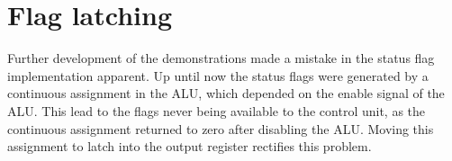 \section{Flag latching} \label{sec:flag-latching}
Further development of the demonstrations made a mistake in the status flag implementation apparent. Up until now the status flags were generated by a continuous assignment in the ALU, which depended on the enable signal of the ALU. This lead to the flags never being available to the control unit, as the continuous assignment returned to zero after disabling the ALU. Moving this assignment to latch into the output register rectifies this problem.

